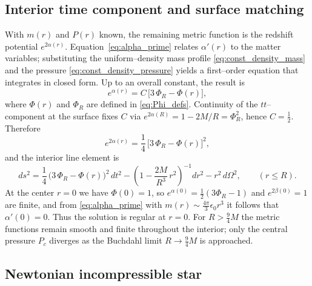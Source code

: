 \subsection*{Interior time component and surface matching}
With $m(r)$ and $P(r)$ known, the remaining metric function is the redshift potential $e^{2\alpha(r)}$. 
Equation~\eqref{eq:alpha_prime} relates $\alpha'(r)$ to the matter variables; substituting the uniform–density mass profile \eqref{eq:const_density_mass} and the pressure \eqref{eq:const_density_pressure} yields a first–order equation that integrates in closed form. 
Up to an overall constant, the result is
\begin{equation}
e^{\alpha(r)}=C\,\bigl[3\,\Phi_{R}-\Phi(r)\bigr],
\label{eq:alpha_shape}
\end{equation}
where $\Phi(r)$ and $\Phi_{R}$ are defined in \eqref{eq:Phi_defs}. 
Continuity of the $tt$–component at the surface fixes $C$ via $e^{2\alpha(R)}=1-2M/R=\Phi_{R}^{2}$, hence $C=\tfrac{1}{2}$. 
Therefore
\begin{equation}
e^{2\alpha(r)}=\frac{1}{4}\,\bigl[3\,\Phi_{R}-\Phi(r)\bigr]^{2},
\label{eq:e2alpha_uniform}
\end{equation}
and the interior line element is
\begin{equation}
ds^{2}
=\frac{1}{4}\,\bigl(3\,\Phi_{R}-\Phi(r)\bigr)^{2}\,dt^{2}
-\left(1-\frac{2M}{R^{3}}\,r^{2}\right)^{-1}\!dr^{2}
-r^{2}\,d\Omega^{2},\qquad (r\le R).
\label{eq:interior_schwarzschild}
\end{equation}
At the center $r=0$ we have $\Phi(0)=1$, so $e^{\alpha(0)}=\tfrac{1}{2}(3\Phi_{R}-1)$ and $e^{2\beta(0)}=1$ are finite, and from \eqref{eq:alpha_prime} with $m(r)\sim \tfrac{4\pi}{3}\epsilon_{0}r^{3}$ it follows that $\alpha'(0)=0$. 
Thus the solution is regular at $r=0$. 
For $R>\frac{9}{4}M$ the metric functions remain smooth and finite throughout the interior; only the central pressure $P_{c}$ diverges as the Buchdahl limit $R\to \frac{9}{4}M$ is approached.

\subsection*{Newtonian incompressible star}

